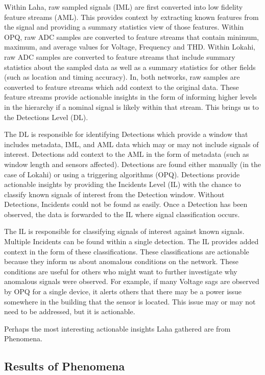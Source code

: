 Within Laha, raw sampled signals (IML) are first converted into low fidelity feature streams (AML). This provides context by extracting known features from the signal and providing a summary statistics view of those features. Within OPQ, raw ADC samples are converted to feature streams that contain minimum, maximum, and average values for Voltage, Frequency and THD. Within Lokahi, raw ADC samples are converted to feature streams that include summary statistics about the sampled data as well as a summary statistics for other fields (such as location and timing accuracy). In, both networks, raw samples are converted to feature streams which add context to the original data. These feature streams provide actionable insights in the form of informing higher levels in the hierarchy if a nominal signal is likely within that stream. This brings us to the Detections Level (DL).

The DL is responsible for identifying Detections which provide a window that includes metadata, IML, and AML data which may or may not include signals of interest. Detections add context to the AML in the form of metadata (such as window length and sensors affected). Detections are found either manually (in the case of Lokahi) or using a triggering algorithms (OPQ). Detections provide actionable insights by providing the Incidents Level (IL) with the chance to classify known signals of interest from the Detection window. Without Detections, Incidents could not be found as easily. Once a Detection has been observed, the data is forwarded to the IL where signal classification occurs.

The IL is responsible for classifying signals of interest against known signals. Multiple Incidents can be found within a single detection. The IL provides added context in the form of these classifications. These classifications are actionable because they inform us about anomalous conditions on the network. These conditions are useful for others who might want to further investigate why anomalous signals were observed. For example, if many Voltage sags are observed by OPQ for a single device, it alerts others that there may be a power issue somewhere in the building that the sensor is located. This issue may or may not need to be addressed, but it is actionable.

Perhaps the most interesting actionable insights Laha gathered are from Phenomena.

\subsection{Results of Phenomena}\label{subsec:results-of-phenomena}

